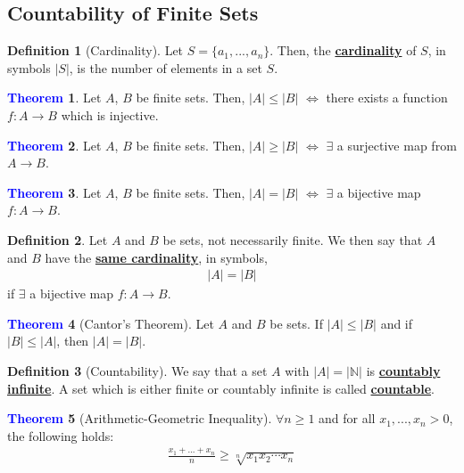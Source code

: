 \documentclass[11pt]{article}
\theoremstyle{definition}
\newcommand{\dfn}[1]{\textbf{{\underline{#1}}}}
\newtheorem{theorem}{\textcolor{blue}{Theorem}}
\theoremstyle{definition}
\newtheorem{definition}{\textcolor{OliveGreen}{Definition}}
\theoremstyle{remark}
\begin{document}
\subsection{Countability of Finite Sets}
\begin{definition}[Cardinality]
	Let $S = \{ a_1, ..., a_n \}$. Then, the \dfn{cardinality} of $S$, in symbols $|S|$, is the number of elements in a set $S$. 
\end{definition}

\begin{theorem}
	Let $A$, $B$ be finite sets. Then, $|A| \leq |B|$ $\iff$ there exists a function $f: A \rightarrow B$ which is injective.
\end{theorem}

\begin{theorem}
	Let $A$, $B$ be finite sets. Then, $|A| \geq |B|$ $\iff$ $\exists$ a surjective map from $A \rightarrow B$.
\end{theorem}

\begin{theorem}
	Let $A$, $B$ be finite sets. Then, $|A| = |B| $ $\iff$ $\exists$ a bijective map $f: A \rightarrow B$.
\end{theorem}

\begin{definition}
	Let $A$ and $B$ be sets, not necessarily finite. We then say that $A$ and $B$ have the \dfn{same cardinality}, in symbols, 
	\begin{align}
		|A| = |B|	
	\end{align}
	if $\exists$ a bijective map $f: A \rightarrow B$. 
\end{definition}

\begin{theorem}[Cantor's Theorem]
	Let $A$ and $B$ be sets. If $|A| \leq |B|$ and if $|B| \leq |A|$, then $|A| = |B|$. 
\end{theorem}

\begin{definition}[Countability]
	We say that a set $A$ with $|A| = | \mathbb{N} |$ is \dfn{countably infinite}. A set which is either finite or countably infinite is called \dfn{countable}.
\end{definition}

\begin{theorem}[Arithmetic-Geometric Inequality]
	$\forall n \geq 1$ and for all $x_1, ..., x_n >0$, the following holds: 
\begin{align}
	\frac{x_1 + ... + x_n}{n} \geq \sqrt[n]{x_1x_2 \cdots x_n }	
\end{align}
\end{theorem}
\end{document}
